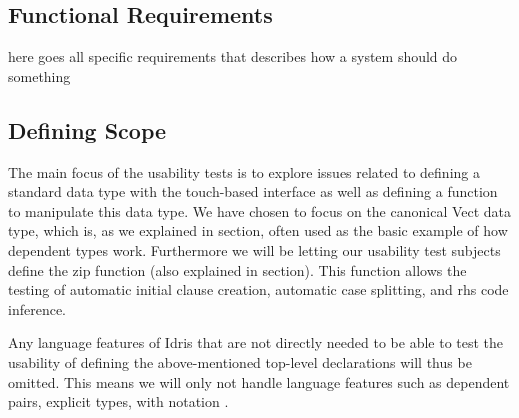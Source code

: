 \subsection{Functional Requirements} \label{subsec:FunctionalRequirements} here
goes all specific requirements that describes how a system should do something


\subsection{Defining Scope} The main focus of the usability tests is to explore
issues related to defining a standard data type with the touch-based interface
as well as defining a function to manipulate this data type. We have chosen to
focus on the canonical Vect data type, which is, as we explained in
section, often used as the basic example of how dependent types
work. Furthermore we will be letting our usability test subjects define the zip
function (also explained in section). This function allows the
testing of automatic initial clause creation, automatic case splitting, and rhs
code inference.

Any language features of Idris that are not directly needed to be able to test
the usability of defining the above-mentioned top-level declarations will thus
be omitted. This means we will only not handle language features such as
dependent pairs, explicit types, with notation .










